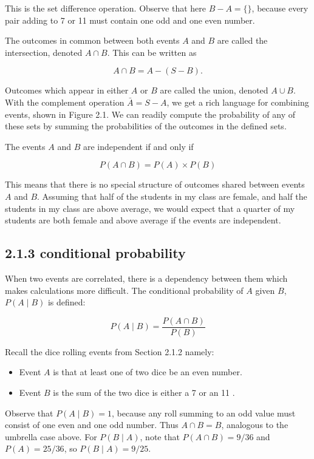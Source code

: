 \documentclass[10pt]{article}
\begin{document}
This is the set difference operation. Observe that here \(B-A=\{\}\), because every pair adding to 7 or 11 must contain one odd and one even number.

The outcomes in common between both events $A$ and $B$ are called the intersection, denoted \(A \cap B\). This can be written as

\[
A \cap B=A-(S-B) .
\]

Outcomes which appear in either $A$ or $B$ are called the union, denoted \(A \cup B\). With the complement operation \(\bar{A}=S-A\), we get a rich language for combining events, shown in Figure 2.1. We can readily compute the probability of any of these sets by summing the probabilities of the outcomes in the defined sets.

The events $A$ and $B$ are independent if and only if

\[
P(A \cap B)=P(A) \times P(B)
\]

This means that there is no special structure of outcomes shared between events $A$ and $B$. Assuming that half of the students in my class are female, and half the students in my class are above average, we would expect that a quarter of my students are both female and above average if the events are independent.

\subsection*{2.1.3 conditional probability}
When two events are correlated, there is a dependency between them which makes calculations more difficult. The conditional probability of $A$ given $B$, \(P(A \mid B)\) is defined:

\[
P(A \mid B)=\frac{P(A \cap B)}{P(B)}
\]

Recall the dice rolling events from Section 2.1.2 namely:

\begin{itemize}
  \item Event $A$ is that at least one of two dice be an even number.
  \item Event $B$ is the sum of the two dice is either a 7 or an 11 .
\end{itemize}

Observe that \(P(A \mid B)=1\), because any roll summing to an odd value must consist of one even and one odd number. Thus \(A \cap B=B\), analogous to the umbrella case above. For \(P(B \mid A)\), note that \(P(A \cap B)=9 / 36\) and \(P(A)=25 / 36\), so \(P(B \mid A)=9 / 25\).
\end{document}
